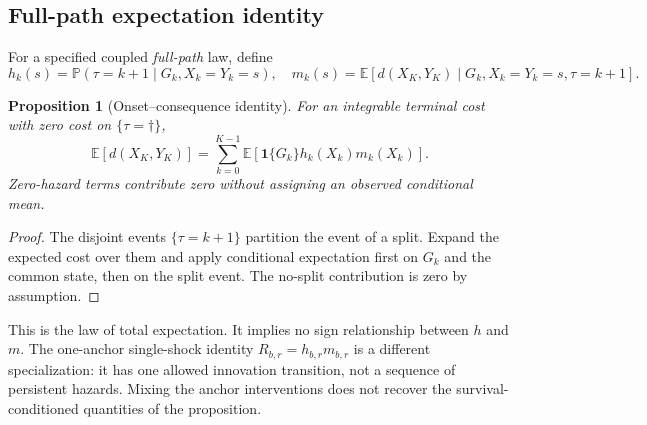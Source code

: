 \documentclass[11pt,a4paper]{article}
\theoremstyle{plain}
\newtheorem{proposition}[theorem]{Proposition}
\theoremstyle{definition}
\theoremstyle{remark}
\newcommand{\Ind}[1]{\mathbf{1}\{#1\}}
\newcommand{\Ex}{\mathbb{E}}
\newcommand{\Prob}{\mathbb{P}}
\begin{document}
\subsection{Full-path expectation identity}
\label{sec:decomp}
For a specified coupled \emph{full-path} law, define
\[
 h_k(s)=\Prob(\tau=k+1\mid G_k,X_k=Y_k=s),\quad
 m_k(s)=\Ex[d(X_K,Y_K)\mid G_k,X_k=Y_k=s,\tau=k+1].
\]
\begin{proposition}[Onset--consequence identity]
\label{prop:decomp}
For an integrable terminal cost with zero cost on $\{\tau=\dagger\}$,
\[
 \Ex[d(X_K,Y_K)]=\sum_{k=0}^{K-1}
 \Ex[\Ind{G_k}h_k(X_k)m_k(X_k)].
\]
Zero-hazard terms contribute zero without assigning an observed conditional mean.
\end{proposition}
\begin{proof}
The disjoint events $\{\tau=k+1\}$ partition the event of a split. Expand the
expected cost over them and apply conditional expectation first on $G_k$ and the
common state, then on the split event. The no-split contribution is zero by
assumption.
\end{proof}
This is the law of total expectation. It implies no sign relationship between
$h$ and $m$. The one-anchor single-shock identity $R_{b,r}=h_{b,r}m_{b,r}$
is a different specialization: it has one allowed innovation transition,
not a sequence of persistent hazards. Mixing the anchor interventions does not
recover the survival-conditioned quantities of the proposition.
\end{document}
